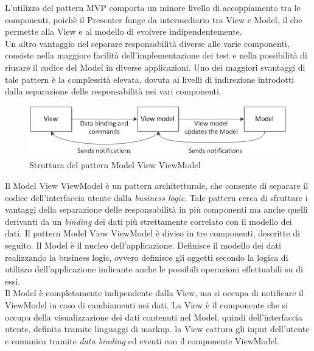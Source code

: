 		L'utilizzo del pattern MVP comporta un minore livello di accoppiamento tra le componenti, poichè il Presenter funge da intermediario tra View e Model, il che permette alla View e al modello di evolvere indipendentemente. \\
		Un altro vantaggio nel separare responsabilità diverse alle varie componenti, consiste nella maggiore facilità dell'implementazione dei test e nella possibilità di riusare il codice del Model in diverse applicazioni.
		Uno dei maggiori svantaggi di tale pattern è la complessità elevata, dovuta ai livelli di indirezione introdotti dalla separazione delle responsabilità nei vari componenti. \\


	 \label{app:MVVM}
	\begin{figure}[H]\centering
    \includegraphics[scale=0.7]{SpecificaTecnica/Pics/MVVM}
    \caption{Struttura del pattern Model View ViewModel}
	\end{figure}
	Il Model View ViewModel è un pattern architetturale, che consente di separare il codice dell'interfaccia utente dalla \textit{business logic}. Tale pattern cerca di sfruttare i vantaggi della separazione delle responsabilità in più componenti ma anche quelli derivanti da un \textit{binding} dei dati più strettamente correlato con il modello dei dati.
		Il pattern Model View ViewModel è diviso in tre componenti, descritte di seguito.
			Il Model è il nucleo dell'applicazione. Definisce il modello dei dati realizzando la business logic, ovvero definisce gli oggetti secondo la logica di utilizzo dell'applicazione indicante anche le possibili operazioni effettuabili su di essi.\\ 
			Il Model è completamente indipendente dalla View, ma si occupa di notificare il ViewModel in caso di cambiamenti nei dati.
			La View è il componente che si occupa della visualizzazione dei dati contenuti nel Model, quindi dell'interfaccia utente, definita tramite linguaggi di markup. la View cattura gli input dell'utente e comunica tramite \textit{data binding} ed eventi con il componente ViewModel.
